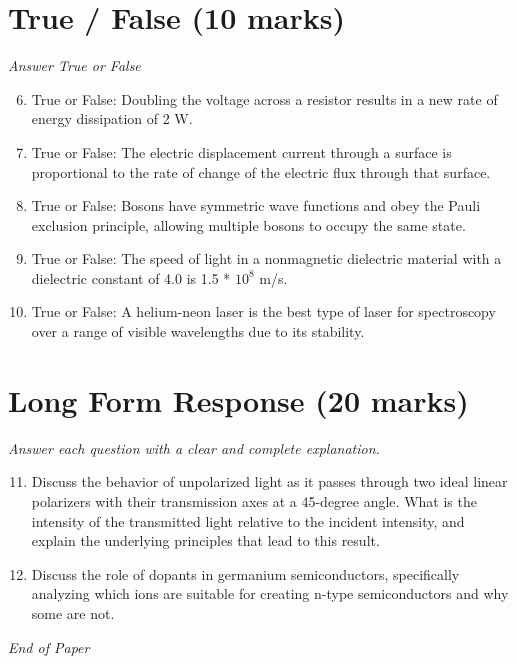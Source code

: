 \documentclass[12pt]{article}
\begin{document}
\section*{True / False (10 marks)}
\textit{Answer True or False}
\begin{enumerate}[label=\arabic*.]
\setcounter{enumi}{5}
\item True or False: Doubling the voltage across a resistor results in a new rate of energy dissipation of 2 W.
\item True or False: The electric displacement current through a surface is proportional to the rate of change of the electric flux through that surface.
\item True or False: Bosons have symmetric wave functions and obey the Pauli exclusion principle, allowing multiple bosons to occupy the same state.
\item True or False: The speed of light in a nonmagnetic dielectric material with a dielectric constant of 4.0 is 1.5 * $10^8$ m/s.
\item True or False: A helium-neon laser is the best type of laser for spectroscopy over a range of visible wavelengths due to its stability.
\end{enumerate}

\section*{Long Form Response (20 marks)}
\textit{Answer each question with a clear and complete explanation.}
\begin{enumerate}[label=\arabic*.]
\setcounter{enumi}{10}
\item Discuss the behavior of unpolarized light as it passes through two ideal linear polarizers with their transmission axes at a 45-degree angle. What is the intensity of the transmitted light relative to the incident intensity, and explain the underlying principles that lead to this result.
\item Discuss the role of dopants in germanium semiconductors, specifically analyzing which ions are suitable for creating n-type semiconductors and why some are not.
\end{enumerate}

\vfill
\noindent\textit{End of Paper}
\end{document}
